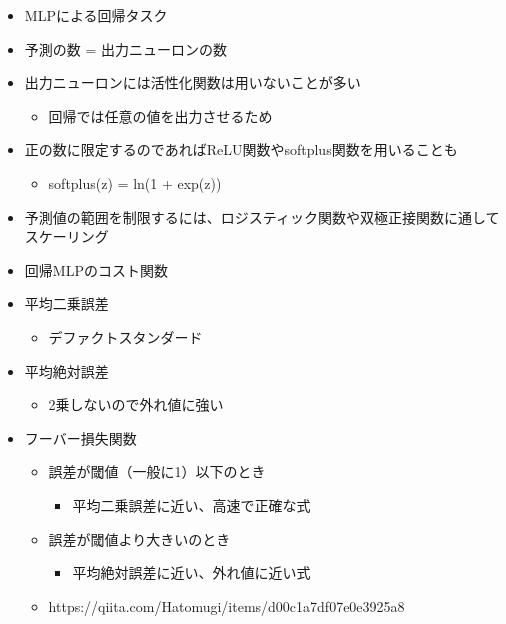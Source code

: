 \begin{itemize}
\item
  MLPによる回帰タスク
\item
  予測の数 = 出力ニューロンの数
\item
  出力ニューロンには活性化関数は用いないことが多い

  \begin{itemize}
  \tightlist
  \item
    回帰では任意の値を出力させるため
  \end{itemize}
\item
  正の数に限定するのであればReLU関数やsoftplus関数を用いることも

  \begin{itemize}
  \tightlist
  \item
    softplus(z) = ln(1 + exp(z))
  \end{itemize}
\item
  予測値の範囲を制限するには、ロジスティック関数や双極正接関数に通してスケーリング
\item
  回帰MLPのコスト関数
\item
  平均二乗誤差

  \begin{itemize}
  \tightlist
  \item
    デファクトスタンダード
  \end{itemize}
\item
  平均絶対誤差

  \begin{itemize}
  \tightlist
  \item
    2乗しないので外れ値に強い
  \end{itemize}
\item
  フーバー損失関数

  \begin{itemize}
  \tightlist
  \item
    誤差が閾値（一般に1）以下のとき

    \begin{itemize}
    \tightlist
    \item
      平均二乗誤差に近い、高速で正確な式
    \end{itemize}
  \item
    誤差が閾値より大きいのとき

    \begin{itemize}
    \tightlist
    \item
      平均絶対誤差に近い、外れ値に近い式
    \end{itemize}
  \item
    https://qiita.com/Hatomugi/items/d00c1a7df07e0e3925a8
  \end{itemize}
\end{itemize}

